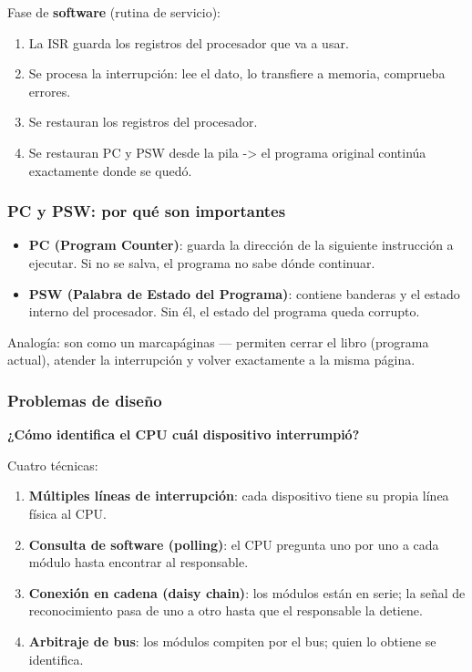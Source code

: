\documentclass{article}
\begin{document}
Fase de \textbf{software} (rutina de servicio):
\begin{enumerate}
\item La ISR guarda los registros del procesador que va a usar.
\item Se procesa la interrupción: lee el dato, lo transfiere a memoria,
comprueba errores.
\item Se restauran los registros del procesador.
\item Se restauran PC y PSW desde la pila -> el programa original continúa
exactamente donde se quedó.
\end{enumerate}

\subsubsection{PC y PSW: por qué son importantes}
\label{sec:org2c6eb70}
\begin{itemize}
\item \textbf{PC (Program Counter)}: guarda la dirección de la siguiente instrucción
a ejecutar. Si no se salva, el programa no sabe dónde continuar.
\item \textbf{PSW (Palabra de Estado del Programa)}: contiene banderas y el estado
interno del procesador. Sin él, el estado del programa queda corrupto.
\end{itemize}

Analogía: son como un marcapáginas — permiten cerrar el libro
(programa actual), atender la interrupción y volver exactamente a la
misma página.

\subsubsection{Problemas de diseño}
\label{sec:orgadfb9ab}
\textbf{¿Cómo identifica el CPU cuál dispositivo interrumpió?}

Cuatro técnicas:
\begin{enumerate}
\item \textbf{Múltiples líneas de interrupción}: cada dispositivo tiene su propia
línea física al CPU.
\item \textbf{Consulta de software (polling)}: el CPU pregunta uno por uno a cada
módulo hasta encontrar al responsable.
\item \textbf{Conexión en cadena (daisy chain)}: los módulos están en serie; la
señal de reconocimiento pasa de uno a otro hasta que el responsable
la detiene.
\item \textbf{Arbitraje de bus}: los módulos compiten por el bus; quien lo obtiene
se identifica.
\end{enumerate}
\end{document}

